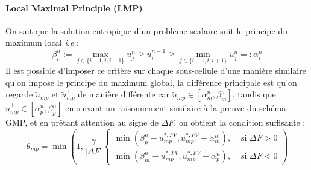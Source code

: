 \paragraph{Local  Maximal Principle (LMP)}
On sait que la solution entropique d'un problème scalaire suit le principe du maximum local \emph{i.e} : 
\begin{equation}
    \beta_i^n := \max_{j\in\{i-1,i,i+1\}} u_j^n \geq u_i^{n+1} \geq \min_{j\in\{i-1,i,i+1\}} u_j^n =: \alpha_i^n
\end{equation}
Il est possible d'imposer ce critère sur chaque sous-cellule d'une manière similaire qu'on impose le principe du maximum global,
la différence principale est qu'on regarde $\widetilde{{u}}_{mp}^{-}$ et $\widetilde{{u}}_{mp}^{+}$ de manière différente car
$\widetilde{{u}}_{mp}^{-} \in \left[\alpha_m^n, \beta_m^n \right]$, tandis que $\widetilde{{u}}_{mp}^{+} \in \left[\alpha_p^n, \beta_p^n \right]$
en suivant un raisonnement similaire à la preuve du schéma GMP, et en prêtant attention au signe de $\Delta F$, on obtient la condition suffisante : 
\begin{equation}
\theta_{mp} = \min \left(1, \frac{\gamma}{|\Delta F|}  \left\{
    \begin{aligned}
    \min\left( \beta_{p}^n-{u}_{mp}^{*,FV},{u}_{mp}^{*,FV} - \alpha_{m}^n \right), &\text{ si }\Delta F >0  \\
    \min\left( \beta_{m}^n-{u}_{mp}^{*,FV},{u}_{mp}^{*,FV} - \alpha_{p}^n \right), &\text{ si }\Delta F <0  
    \end{aligned}\right.
    \right)
\end{equation}  

